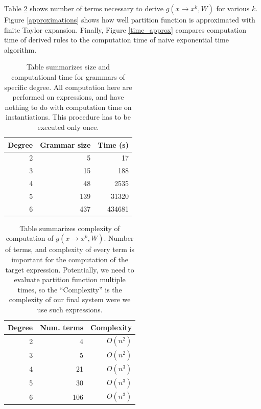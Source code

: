 Table \ref{eval} shows number of terms necessary to derive $g(x
\rightarrow x^k, W)$ for various $k$. Figure \ref{approximations} shows
how well partition function is approximated with finite Taylor
expansion. Finally, Figure \ref{time_approx} compares computation time
of derived rules to the computation time of naive exponential time
algorithm.

\begin{table}
\tiny
\centering
\begin{tabular}{rrr}
\hline
Degree & Grammar size & Time (s) \\
\hline
2 & 5 & 17 \\
3 & 15 & 188 \\
4 & 48 & 2535\\
5 & 139 & 31320 \\
6 & 437 & 434681 \\
\hline
\end{tabular}
\caption{Table summarizes size and computational time for grammars of specific degree. 
All computation here are performed on expressions, and have nothing to do with computation time on instantiations.
This procedure has to be executed only once.}
\label{grammars}
\end{table}

\begin{table}
\tiny
\centering
\begin{tabular}{rrr}
\hline
Degree & Num. terms & Complexity \\
\hline
2 & 4 & $O(n^2)$\\
3 & 5 & $O(n^2)$\\
4 & 21 & $O(n^3)$\\
5 & 30 & $O(n^3)$\\
6 & 106 & $O(n^3)$\\
\hline
\end{tabular}
\caption{Table summarizes complexity of computation of $g(x \rightarrow x^k, W)$. 
Number of terms, and complexity of every term is important for the computation of the target expression.
Potentially, we need to evaluate partition function multiple times, so the ``Complexity''
is the complexity of our final system were we use such expressions.} 
\label{eval}
\end{table}


